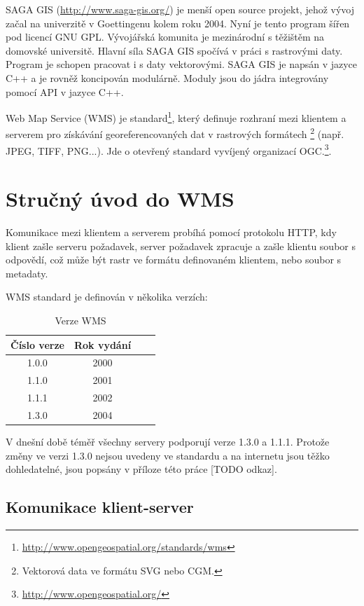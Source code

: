 \documentclass[a4paper,12pt]{article}
\begin{document}
SAGA GIS (\url{http://www.saga-gis.org/}) je menší open source projekt, jehož vývoj začal na
 univerzitě v Goettingenu kolem roku 2004. Nyní je tento program šířen pod  licencí GNU GPL. Vývojářská 
komunita je mezinárodní s těžištěm na domovské universitě. Hlavní síla SAGA GIS spočívá v práci s rastrovými daty. Program je schopen pracovat i s daty vektorovými. 
SAGA GIS je napsán v jazyce  C++ a je rovněž koncipován modulárně. Moduly jsou do jádra integrovány pomocí API v jazyce C++.

Web Map Service (WMS) je standard\footnote{\url{http://www.opengeospatial.org/standards/wms}}, který definuje rozhraní mezi klientem 
a serverem pro získávání georeferencovaných dat v rastrových formátech \footnote{ Vektorová data ve formátu SVG nebo CGM.} (např. JPEG, TIFF, PNG...). 
Jde o otevřený standard vyvíjený organizací OGC.\footnote{\url{http://www.opengeospatial.org/}}.  


\newpage
\section{Stručný úvod do WMS}

Komunikace mezi klientem a serverem probíhá pomocí protokolu HTTP, kdy klient zašle serveru požadavek, 
server požadavek zpracuje a  zašle klientu soubor s odpovědí, což může být rastr ve formátu definovaném klientem, nebo soubor s metadaty.

WMS standard je definován v několika verzích:

\begin{table}[h]
\centering
\begin{tabular}{|c|c|c|c|}      \hline
  Číslo verze  & Rok vydání  \\ \hline
  1.0.0        &  2000       \\ \hline
  1.1.0        &  2001       \\ \hline
  1.1.1        &  2002       \\ \hline
  1.3.0        &  2004       \\ \hline
\end{tabular}
\caption{Verze WMS}
\label{tab:verze}
\end{table}

V dnešní době téměř všechny servery podporují verze 1.3.0 a 1.1.1. Protože
změny ve verzi 1.3.0 nejsou uvedeny ve standardu a na internetu jsou těžko dohledatelné, jsou popsány v příloze této práce [TODO odkaz].


\subsection{Komunikace klient-server}
\end{document}
